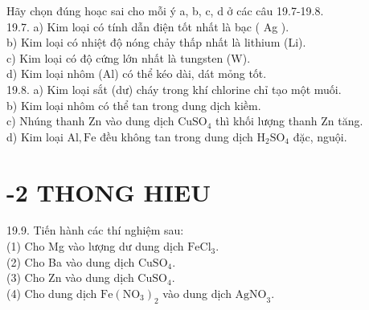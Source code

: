 \documentclass[10pt]{article}
\begin{document}
Hãy chọn đúng hoạc sai cho mỗi ý a, b, c, d ở các câu 19.7-19.8.\\
19.7. a) Kim loại có tính dẫn điện tốt nhất là bạc ( Ag ).\\
b) Kim loại có nhiệt độ nóng chảy thấp nhất là lithium (Li).\\
c) Kim loại có độ cứng lớn nhất là tungsten (W).\\
d) Kim loại nhôm (Al) có thể kéo dài, dát mỏng tốt.\\
19.8. a) Kim loại sắt (dư) cháy trong khí chlorine chỉ tạo một muối.\\
b) Kim loại nhôm có thể tan trong dung dịch kiềm.\\
c) Nhúng thanh Zn vào dung dịch $\mathrm{CuSO}_{4}$ thì khối lượng thanh Zn tăng.\\
d) Kim loại $\mathrm{Al}, \mathrm{Fe}$ đều không tan trong dung dịch $\mathrm{H}_{2} \mathrm{SO}_{4}$ đặc, nguội.

\section*{-2 THONG HIEU}
19.9. Tiến hành các thí nghiệm sau:\\
(1) Cho Mg vào lượng dư dung dịch $\mathrm{FeCl}_{3}$.\\
(2) Cho Ba vào dung dịch $\mathrm{CuSO}_{4}$.\\
(3) Cho Zn vào dung dịch $\mathrm{CuSO}_{4}$.\\
(4) Cho dung dịch $\mathrm{Fe}\left(\mathrm{NO}_{3}\right)_{2}$ vào dung dịch $\mathrm{AgNO}_{3}$.
\end{document}
